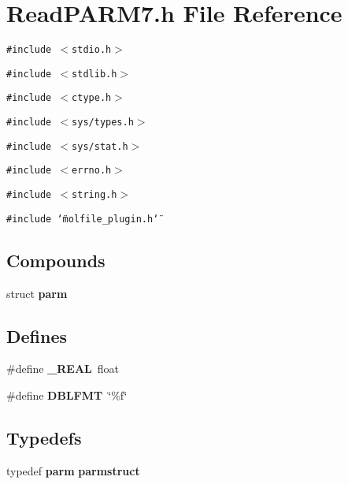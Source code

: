 \section{Read\-PARM7.h File Reference}
\label{ReadPARM7_8h}
{\tt \#include $<$stdio.h$>$}\par
{\tt \#include $<$stdlib.h$>$}\par
{\tt \#include $<$ctype.h$>$}\par
{\tt \#include $<$sys/types.h$>$}\par
{\tt \#include $<$sys/stat.h$>$}\par
{\tt \#include $<$errno.h$>$}\par
{\tt \#include $<$string.h$>$}\par
{\tt \#include \char`\"{}molfile\_\-plugin.h\char`\"{}}\par
\subsection*{Compounds}
\begin{CompactItemize}
\item 
struct {\bf parm}
\end{CompactItemize}
\subsection*{Defines}
\begin{CompactItemize}
\item 
\#define {\bf \_\-REAL}\ float
\item 
\#define {\bf DBLFMT}\ \char`\"{}\%f\char`\"{}
\end{CompactItemize}
\subsection*{Typedefs}
\begin{CompactItemize}
\item 
typedef {\bf parm} {\bf parmstruct}
\end{CompactItemize}
